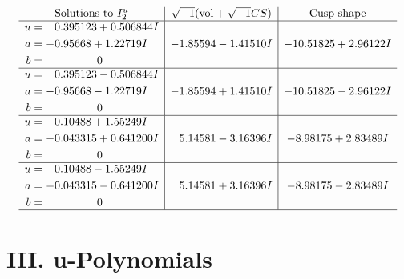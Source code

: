 \documentclass[1p]{elsarticle_modified}
\theoremstyle{definition}
\newcommand{\I}{\sqrt{-1}}
\begin{document}
$$\begin{array}{c|c|c}  
\text{Solutions to }I^u_{2}& \I (\text{vol} + \sqrt{-1}CS) & \text{Cusp shape}\\
 \hline 
\begin{aligned}
u &= \phantom{-}0.395123 + 0.506844 I \\
a &= -0.95668 + 1.22719 I \\
b &= \phantom{-0.000000 } 0\end{aligned}
 & -1.85594 - 1.41510 I & -10.51825 + 2.96122 I \\ \hline\begin{aligned}
u &= \phantom{-}0.395123 - 0.506844 I \\
a &= -0.95668 - 1.22719 I \\
b &= \phantom{-0.000000 } 0\end{aligned}
 & -1.85594 + 1.41510 I & -10.51825 - 2.96122 I \\ \hline\begin{aligned}
u &= \phantom{-}0.10488 + 1.55249 I \\
a &= -0.043315 + 0.641200 I \\
b &= \phantom{-0.000000 } 0\end{aligned}
 & \phantom{-}5.14581 - 3.16396 I & -8.98175 + 2.83489 I \\ \hline\begin{aligned}
u &= \phantom{-}0.10488 - 1.55249 I \\
a &= -0.043315 - 0.641200 I \\
b &= \phantom{-0.000000 } 0\end{aligned}
 & \phantom{-}5.14581 + 3.16396 I & -8.98175 - 2.83489 I\\
 \hline 
 \end{array}$$\newpage
\newpage\renewcommand{\arraystretch}{1}
\centering \section*{ III. u-Polynomials}
\end{document}
